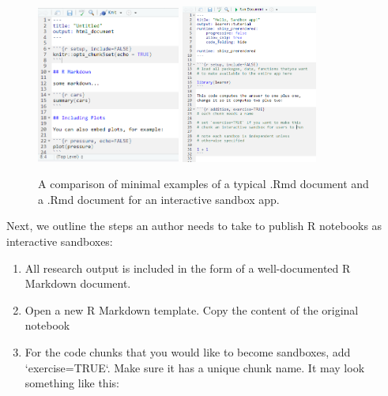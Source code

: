 \begin{figure}
         \includegraphics[width=0.42\textwidth]{skeleton-md}
         \hfill
         \includegraphics[width=0.4\textwidth]{skeleton}
\caption[A comparison of minimal examples of a typical .Rmd document and a .Rmd document for an interactive sandbox app]{A comparison of minimal examples of a typical .Rmd document and a .Rmd document for an interactive sandbox app.}\label{fig:fig_skeleton}
\end{figure}

Next, we outline the steps an author needs to take to publish R
notebooks as interactive sandboxes:

\begin{enumerate}
\def\labelenumi{\arabic{enumi}.}
\tightlist
\item
  All research output is included in the form of a well-documented R
  Markdown document.
\item
  Open a new  R Markdown template. Copy the content of
  the original notebook
\item
  For the code chunks that you would like to become sandboxes, add
  `exercise=TRUE`. Make sure it has a unique chunk name. It may
  look something like this:
\end{enumerate}


